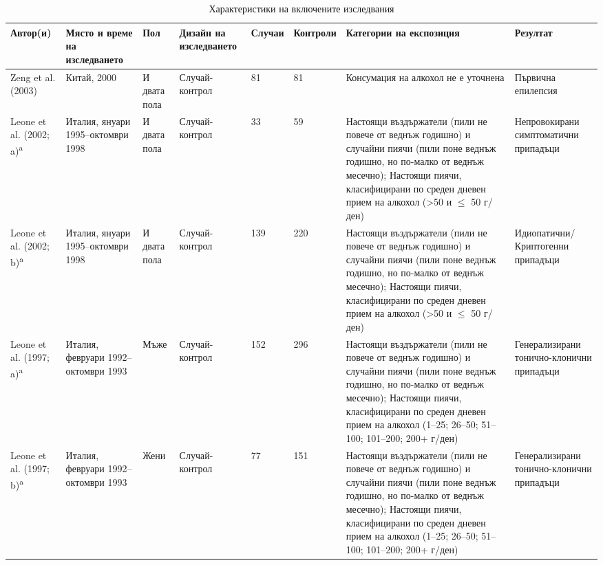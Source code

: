 \documentclass{article}
\begin{document}
\begin{table}
  \centering
  \small %
  
  \caption{Характеристики на включените изследвания}
  \begin{threeparttable}
  \begin{tabular}{|p{2.5cm}|p{3cm}|p{1.5cm}|p{2cm}|p{1cm}|p{1cm}|p{7.5cm}|p{2cm}|}
  \hline
  \textbf{Автор(и)} & \textbf{Място и време на изследването} & \textbf{Пол} & \textbf{Дизайн на изследването} & \textbf{Случаи} & \textbf{Контроли} & \textbf{Категории на експозиция} & \textbf{Резултат} \\ \hline
  Zeng et al. (2003) & Китай, 2000 & И двата пола & Случай-контрол & 81 & 81 & Консумация на алкохол не е уточнена & Първична епилепсия \\ \hline
  Leone et al. (2002; a)\textsuperscript{a} & Италия, януари 1995--октомври 1998 & И двата пола & Случай-контрол & 33 & 59 & Настоящи въздържатели (пили не повече от веднъж годишно) и случайни пиячи (пили поне веднъж годишно, но по-малко от веднъж месечно); Настоящи пиячи, класифицирани по среден дневен прием на алкохол (>50 и $\leq$ 50 г/ден) & Непровокирани симптоматични припадъци \\ \hline
  Leone et al. (2002; b)\textsuperscript{a} & Италия, януари 1995--октомври 1998 & И двата пола & Случай-контрол & 139 & 220 & Настоящи въздържатели (пили не повече от веднъж годишно) и случайни пиячи (пили поне веднъж годишно, но по-малко от веднъж месечно); Настоящи пиячи, класифицирани по среден дневен прием на алкохол (>50 и $\leq$ 50 г/ден) & Идиопатични/Криптогенни припадъци \\ \hline
  Leone et al. (1997; a)\textsuperscript{a} & Италия, февруари 1992--октомври 1993 & Мъже & Случай-контрол & 152 & 296 & Настоящи въздържатели (пили не повече от веднъж годишно) и случайни пиячи (пили поне веднъж годишно, но по-малко от веднъж месечно); Настоящи пиячи, класифицирани по среден дневен прием на алкохол (1--25; 26--50; 51--100; 101--200; 200+ г/ден) & Генерализирани тонично-клонични припадъци \\ \hline
  Leone et al. (1997; b)\textsuperscript{a} & Италия, февруари 1992--октомври 1993 & Жени & Случай-контрол & 77 & 151 & Настоящи въздържатели (пили не повече от веднъж годишно) и случайни пиячи (пили поне веднъж годишно, но по-малко от веднъж месечно); Настоящи пиячи, класифицирани по среден дневен прием на алкохол (1--25; 26--50; 51--100; 101--200; 200+ г/ден) & Генерализирани тонично-клонични припадъци \\ \hline

\end{tabular}
\end{threeparttable}
\end{table}
\end{document}
